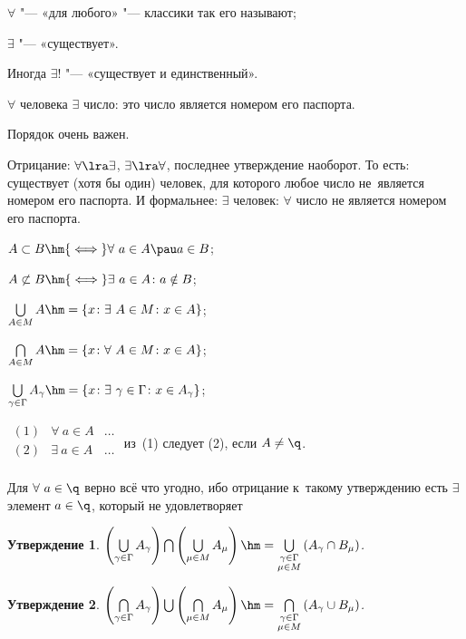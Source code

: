 \documentclass[a4paper,10pt,twoside]{article}
\newtheorem{Ut}{Утверждение}[section]
\begin{document}
$\forall$ "--- «для любого» "--- классики так его называют;

$\exists$ "--- «существует».

Иногда $\exists!$ "--- «существует и единственный».

$\forall$ человека $\exists$ число: это число является номером его паспорта. 

Порядок очень важен.

Отрицание: $\forall \lra \exists$, $\exists\lra\forall$, последнее утверждение наоборот. То есть: существует (хотя бы один) человек, для которого любое число не~является номером его паспорта.
И формальнее: $\exists$ человек: $\forall$ число не является номером его паспорта.

$A\subset B \hm{\iff} \forall\  a\in A\pau a\in B$;

$A\not\subset B \hm{\iff} \exists\  a\in A\colon a\notin B$;

$\bigcup\limits_{A\in M} A\hm=\{x\colon \exists\  A\in M\colon x\in A\}$;

$\bigcap\limits_{A\in M} A\hm=\{x\colon \forall\  A\in M\colon x\in A\}$;

$\bigcup\limits_{{\gamma\in \Gamma}} A_{\gamma}\hm=\{x\colon \exists\  \gamma\in\Gamma\colon x\in A_\gamma\}$;


$\begin{matrix}
(1)&\forall\  a\in A&\ldots\\
(2)& \exists\  a\in A&\ldots \\
\end{matrix}$ \qquad из~(1) следует (2), если $A\neq \q$.

Для $\forall\  a\in \q$ верно всё что угодно, ибо отрицание к~такому утверждению есть $\exists$ элемент $a\in\q$, который не удовлетворяет\ldotst{}


        \begin{Ut} $\left(\bigcup\limits_{\gamma\in \Gamma} A_\gamma\right)\bigcap
            \left(\bigcup\limits_{\mu\in M} A_\mu\right)\hm=\bigcup\limits_{\substack{\gamma\in \Gamma \\ \mu\in M}} \left(A_\gamma\cap B_\mu\right)$.
        \end{Ut}
        \begin{Ut} $\left(\bigcap\limits_{\gamma\in \Gamma} A_\gamma\right)\bigcup
            \left(\bigcap\limits_{\mu\in M} A_\mu\right)\hm=\bigcap\limits_{\substack{\gamma\in \Gamma \\ \mu\in M}} \left(A_\gamma\cup B_\mu\right)$.
        \end{Ut}
\end{document}
